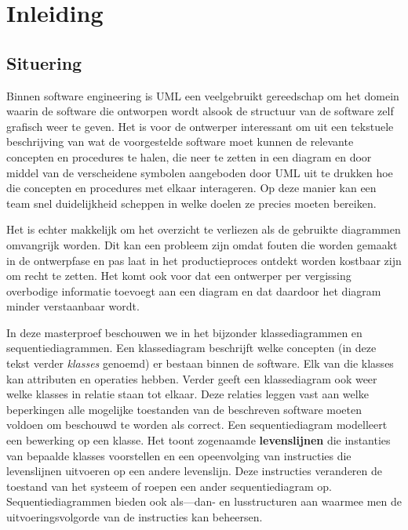 \chapter{Inleiding}

\section{Situering}\label{sec:situering}

Binnen software engineering is UML\cite{RumbaughJames2005Tuml} een veelgebruikt gereedschap om het domein waarin de software die ontworpen wordt alsook de structuur van de software zelf grafisch weer te geven. Het is voor de ontwerper interessant om uit een tekstuele beschrijving van wat de voorgestelde software moet kunnen de relevante concepten en procedures te halen, die neer te zetten in een diagram en door middel van de verscheidene symbolen aangeboden door UML uit te drukken hoe die concepten en procedures met elkaar interageren. Op deze manier kan een team snel duidelijkheid scheppen in welke doelen ze precies moeten bereiken.

Het is echter makkelijk om het overzicht te verliezen als de gebruikte diagrammen omvangrijk worden. Dit kan een probleem zijn omdat fouten die worden gemaakt in de ontwerpfase en pas laat in het productieproces ontdekt worden kostbaar zijn om recht te zetten. Het komt ook voor dat een ontwerper per vergissing overbodige informatie toevoegt aan een diagram en dat daardoor het diagram minder verstaanbaar wordt.

In deze masterproef beschouwen we in het bijzonder klassediagrammen en sequentiediagrammen\cite{RumbaughJames2005Tuml}.
Een klassediagram beschrijft welke concepten (in deze tekst verder \textit{klasses} genoemd) er bestaan binnen de software. Elk van die klasses kan attributen en operaties hebben. Verder geeft een klassediagram ook weer welke klasses in relatie staan tot elkaar. Deze relaties leggen vast aan welke beperkingen alle mogelijke toestanden van de beschreven software moeten voldoen om beschouwd te worden als correct.
Een sequentiediagram modelleert een bewerking op een klasse. Het toont zogenaamde \textbf{levenslijnen} die instanties van bepaalde klasses voorstellen en een opeenvolging van instructies die levenslijnen uitvoeren op een andere levenslijn. Deze instructies veranderen de toestand van het systeem of roepen een ander sequentiediagram op. Sequentiediagrammen bieden ook als---dan- en lusstructuren aan waarmee men de uitvoeringsvolgorde van de instructies kan beheersen.

